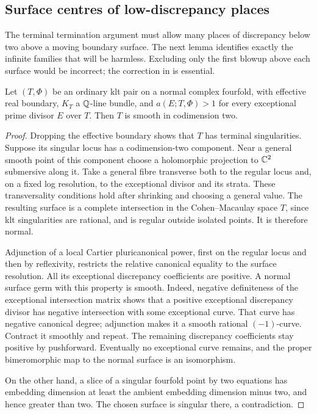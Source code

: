 \subsection{Surface centres of low-discrepancy places}

The terminal termination argument must allow many places of discrepancy
below two above a moving boundary surface.  The next lemma identifies
exactly the infinite families that will be harmless.  Excluding only
the first blowup above each surface would be incorrect; the correction
in \cite[Proposition~3.1 and Lemma~3.2]{Fujino2005Addendum} is essential.

\begin{lemma}\label{lem:terminal-codim-two}
Let $(T,\Phi)$ be an ordinary klt pair on a normal complex fourfold,
with effective real boundary, $K_T$ a $\mathbb Q$-line bundle, and
$a(E;T,\Phi)>1$ for every exceptional prime divisor $E$ over $T$.
Then $T$ is smooth in codimension two.
\end{lemma}

\begin{proof}
Dropping the effective boundary shows that $T$ has terminal
singularities.  Suppose its singular locus has a codimension-two
component.  Near a general smooth point of this component choose a
holomorphic projection to $\mathbb C^2$ submersive along it.  Take a general
fibre transverse both to the regular locus and, on a fixed log
resolution, to the exceptional divisor and its strata.  These
transversality conditions hold after shrinking and choosing a general
value.  The resulting surface is a complete intersection in the
Cohen--Macaulay space $T$, since klt singularities are rational, and is
regular outside isolated points.  It is therefore normal.

Adjunction of a local Cartier pluricanonical power, first on the regular
locus and then by reflexivity, restricts the relative canonical equality
to the surface resolution.  All its exceptional discrepancy coefficients
are positive.  A normal surface germ with this property is smooth.
Indeed, negative definiteness of the exceptional intersection matrix
shows that a positive exceptional discrepancy divisor has negative
intersection with some exceptional curve.  That curve has negative
canonical degree; adjunction makes it a smooth rational $(-1)$-curve.
Contract it smoothly and repeat.  The remaining discrepancy coefficients
stay positive by pushforward.  Eventually no exceptional curve remains,
and the proper bimeromorphic map to the normal surface is an isomorphism.

On the other hand, a slice of a singular fourfold point by two equations
has embedding dimension at least the ambient embedding dimension minus
two, and hence greater than two.  The chosen surface is singular there,
a contradiction.
\end{proof}

